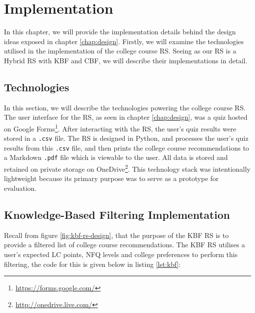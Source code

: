 \chapter{Implementation}
\label{chap:implementation}
\lstset{language=Python, captionpos=b, frame=single}
\captionsetup{width=.8\linewidth} 

In this chapter, we will provide the implementation details behind the design ideas exposed in chapter \ref{chap:design}.
Firstly, we will examine the technologies utilised in the implementation of the college course RS.
Seeing as our RS is a Hybrid RS with KBF and CBF, we will describe their implementations in detail.

\section{Technologies}

In this section, we will describe the technologies powering the college course RS.
The user interface for the RS, as seen in chapter \ref{chap:design}, was a quiz hosted on Google Forms\footnote{\url{https://forms.google.com/}}.
After interacting with the RS, the user's quiz results were stored in a \verb|.csv| file.
The RS is designed in Python, and processes the user's quiz results from this \verb|.csv| file,
and then prints the college course recommendations to a Markdown \verb|.pdf| file 
which is viewable to the user.
All data is stored and retained on private storage on OneDrive\footnote{\url{http://onedrive.live.com/}}.
This technology stack was intentionally lightweight because its primary purpose was 
to serve as a prototype for evaluation.

\section{Knowledge-Based Filtering Implementation}
\label{sec:kbf-impl}

Recall from figure \ref{fig:kbf-rs-design}, that the purpose of the KBF RS is to provide a filtered list of college course recommendations.
The KBF RS utilises a user's expected LC points, NFQ levels and college preferences to perform this filtering,
the code for this is given below in listing \ref{lst:kbf}:

